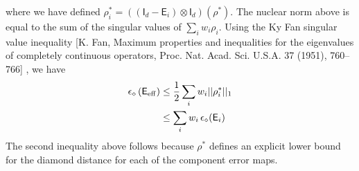 \documentclass[aps,nofootinbib,pra,notitlepage,twocolumn]{revtex4-1}
\newcommand{\deriv}[0]{{\frac{d}{d\vec{\delta}}}}
\def\id{\mbox{\small 1} \!\! \mbox{1}}
\begin{document}
where we have defined $\rho^*_i = ((\mathsf{I}_d - \mathsf{E}_i) \otimes \mathsf{I}_d)(\rho^*)$. The nuclear norm above is equal to the sum of the singular values of $\sum_i w_i \rho_i$. Using the Ky Fan singular value inequality [K. Fan, Maximum properties and inequalities for the eigenvalues of completely continuous operators, Proc. Nat. Acad. Sci. U.S.A. 37 (1951), 760–766] , we have 
\begin{align}
	\epsilon_\diamond \left(\mathsf{E}_{\rm eff}\right)
		&\le \frac{1}{2} \sum_i w_i \vert \vert \rho^*_i \vert\vert_1 \\
		&\le \sum_i w_i\, \epsilon_\diamond(\mathsf{E}_i)
\end{align}
The second inequality above follows because $\rho^*$ defines an explicit lower bound for the diamond distance for each of the component error maps. 


\end{document}

